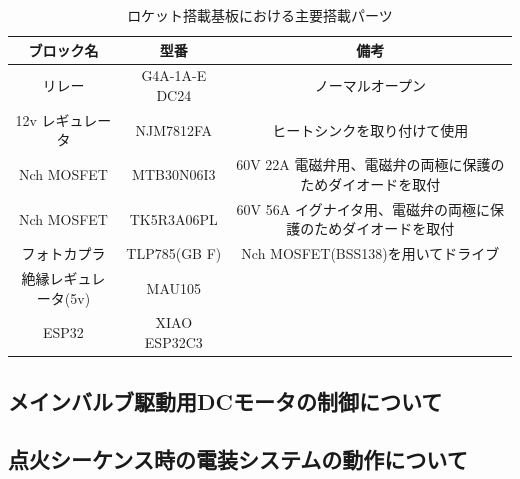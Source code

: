 \documentclass[dvipdfmx,a4j]{jsarticle}
\begin{document}
\begin{table}[htbp]
    \begin{tabular}{c|c|c}
        \hline
        ブロック名           & 型番          & 備考                                                           \\ \hline \hline
        リレー               & G4A-1A-E DC24 & ノーマルオープン                                               \\ \hline
        12v レギュレータ     & NJM7812FA     & ヒートシンクを取り付けて使用                                   \\ \hline
        Nch MOSFET           & MTB30N06I3    & 60V 22A 電磁弁用、電磁弁の両極に保護のためダイオードを取付     \\ \hline
        Nch MOSFET           & TK5R3A06PL    & 60V 56A イグナイタ用、電磁弁の両極に保護のためダイオードを取付 \\ \hline
        フォトカプラ         & TLP785(GB F)  & Nch MOSFET(BSS138)を用いてドライブ                             \\ \hline
        絶縁レギュレータ(5v) & MAU105        &                                                                \\ \hline
        ESP32                & XIAO ESP32C3  &                                                                \\
        \hline
    \end{tabular}
    \caption{ロケット搭載基板における主要搭載パーツ}
    \label{GSEAviPartList}
\end{table}

\subsection{メインバルブ駆動用DCモータの制御について}

\subsection{点火シーケンス時の電装システムの動作について}
\end{document}
